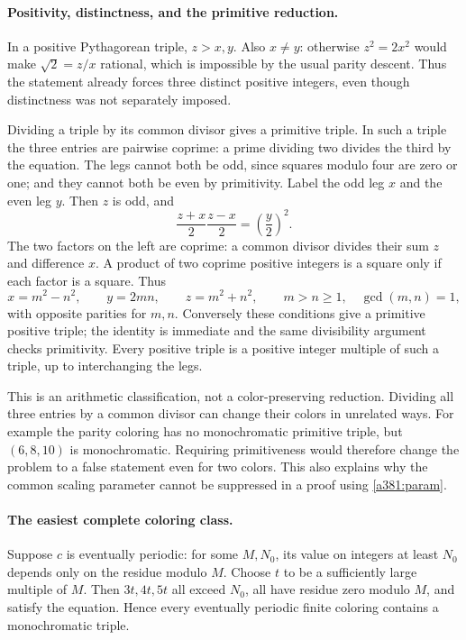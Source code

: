 \documentclass[11pt]{article}
\begin{document}
\paragraph{Positivity, distinctness, and the primitive reduction.}
In a positive Pythagorean triple, $z>x,y$. Also $x\ne y$: otherwise $z^2=2x^2$ would make $\sqrt2=z/x$ rational, which is impossible by the usual parity descent. Thus the statement already forces three distinct positive integers, even though distinctness was not separately imposed.

Dividing a triple by its common divisor gives a primitive triple. In such a triple the three entries are pairwise coprime: a prime dividing two divides the third by the equation. The legs cannot both be odd, since squares modulo four are zero or one; and they cannot both be even by primitivity. Label the odd leg $x$ and the even leg $y$. Then $z$ is odd, and
\[
              \frac{z+x}{2}\frac{z-x}{2}=\left(\frac y2\right)^2.
\]
The two factors on the left are coprime: a common divisor divides their sum $z$ and difference $x$. A product of two coprime positive integers is a square only if each factor is a square. Thus
\begin{equation}\label{a381:param}
       x=m^2-n^2,\qquad y=2mn,\qquad z=m^2+n^2,
       \qquad m>n\geq1,\quad\gcd(m,n)=1,
\end{equation}
with opposite parities for $m,n$. Conversely these conditions give a primitive positive triple; the identity is immediate and the same divisibility argument checks primitivity. Every positive triple is a positive integer multiple of such a triple, up to interchanging the legs.

This is an arithmetic classification, not a color-preserving reduction. Dividing all three entries by a common divisor can change their colors in unrelated ways. For example the parity coloring has no monochromatic primitive triple, but $(6,8,10)$ is monochromatic. Requiring primitiveness would therefore change the problem to a false statement even for two colors. This also explains why the common scaling parameter cannot be suppressed in a proof using \eqref{a381:param}.

\paragraph{The easiest complete coloring class.}
Suppose $c$ is eventually periodic: for some $M,N_0$, its value on integers at least $N_0$ depends only on the residue modulo $M$. Choose $t$ to be a sufficiently large multiple of $M$. Then $3t,4t,5t$ all exceed $N_0$, all have residue zero modulo $M$, and satisfy the equation. Hence every eventually periodic finite coloring contains a monochromatic triple.
\end{document}
